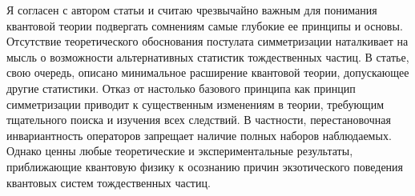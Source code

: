 \documentclass[a4paper, 12pt]{article}
\begin{document}
Я согласен с автором статьи и считаю чрезвычайно важным для понимания 
квантовой теории подвергать сомнениям самые глубокие ее принципы 
и основы. Отсутствие теоретического обоснования постулата симметризации 
наталкивает на мысль о возможности альтернативных статистик 
тождественных частиц. В статье, свою очередь, описано минимальное 
расширение квантовой теории, допускающее другие статистики.
%
Отказ от настолько базового принципа как принцип симметризации приводит 
к существенным изменениям в теории, требующим тщательного поиска 
и изучения всех следствий. В частности, перестановочная инвариантность 
операторов запрещает наличие полных наборов наблюдаемых.
%
Однако ценны любые теоретические и экспериментальные результаты, 
приближающие квантовую физику к осознанию причин экзотического поведения 
квантовых систем тождественных частиц.

% 
% 
% 
% 

\end{document}
